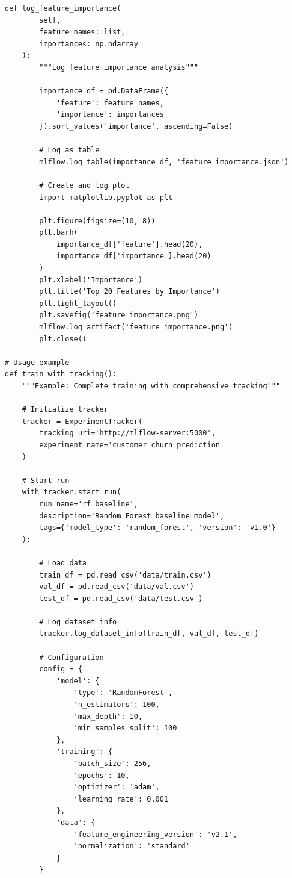 \begin{lstlisting}[style=python, caption=Comprehensive Experiment Tracking with MLflow]
    def log_feature_importance(
        self,
        feature_names: list,
        importances: np.ndarray
    ):
        """Log feature importance analysis"""

        importance_df = pd.DataFrame({
            'feature': feature_names,
            'importance': importances
        }).sort_values('importance', ascending=False)

        # Log as table
        mlflow.log_table(importance_df, 'feature_importance.json')

        # Create and log plot
        import matplotlib.pyplot as plt

        plt.figure(figsize=(10, 8))
        plt.barh(
            importance_df['feature'].head(20),
            importance_df['importance'].head(20)
        )
        plt.xlabel('Importance')
        plt.title('Top 20 Features by Importance')
        plt.tight_layout()
        plt.savefig('feature_importance.png')
        mlflow.log_artifact('feature_importance.png')
        plt.close()

# Usage example
def train_with_tracking():
    """Example: Complete training with comprehensive tracking"""

    # Initialize tracker
    tracker = ExperimentTracker(
        tracking_uri='http://mlflow-server:5000',
        experiment_name='customer_churn_prediction'
    )

    # Start run
    with tracker.start_run(
        run_name='rf_baseline',
        description='Random Forest baseline model',
        tags={'model_type': 'random_forest', 'version': 'v1.0'}
    ):

        # Load data
        train_df = pd.read_csv('data/train.csv')
        val_df = pd.read_csv('data/val.csv')
        test_df = pd.read_csv('data/test.csv')

        # Log dataset info
        tracker.log_dataset_info(train_df, val_df, test_df)

        # Configuration
        config = {
            'model': {
                'type': 'RandomForest',
                'n_estimators': 100,
                'max_depth': 10,
                'min_samples_split': 100
            },
            'training': {
                'batch_size': 256,
                'epochs': 10,
                'optimizer': 'adam',
                'learning_rate': 0.001
            },
            'data': {
                'feature_engineering_version': 'v2.1',
                'normalization': 'standard'
            }
        }


\end{lstlisting}
